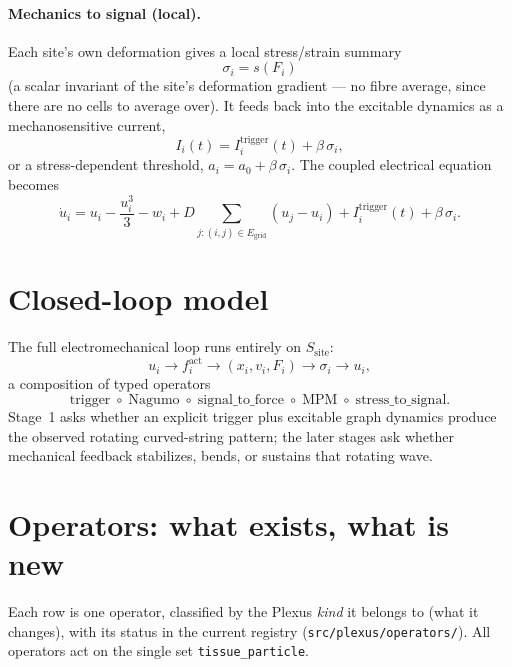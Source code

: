 \documentclass[11pt]{article}
\newcommand{\code}[1]{\texttt{#1}}
\begin{document}
\paragraph{Mechanics to signal (local).}
Each site's own deformation gives a local stress/strain summary
\[
  \sigma_i = s(F_i)
\]
(a scalar invariant of the site's deformation gradient --- no fibre average, since
there are no cells to average over). It feeds back into the excitable dynamics as a
mechanosensitive current,
\[
  I_i(t)=I_i^{\mathrm{trigger}}(t)+\beta\,\sigma_i,
\]
or a stress-dependent threshold, $a_i=a_0+\beta\,\sigma_i$. The coupled electrical
equation becomes
\[
  \dot u_i
    = u_i-\frac{u_i^3}{3}-w_i
      + D\!\!\sum_{j:(i,j)\in E_{\mathrm{grid}}}\!\!(u_j-u_i)
      + I_i^{\mathrm{trigger}}(t)
      + \beta\,\sigma_i.
\]

\section{Closed-loop model}

The full electromechanical loop runs entirely on $S_{\mathrm{site}}$:
\[
  u_i
  \longrightarrow f_i^{\mathrm{act}}
  \longrightarrow (x_i,v_i,F_i)
  \longrightarrow \sigma_i
  \longrightarrow u_i,
\]
a composition of typed operators
\[
  \mathrm{trigger}\;\circ\;\mathrm{Nagumo}\;\circ\;
  \mathrm{signal\_to\_force}\;\circ\;\mathrm{MPM}\;\circ\;\mathrm{stress\_to\_signal}.
\]
Stage~1 asks whether an explicit trigger plus excitable graph dynamics produce the
observed rotating curved-string pattern; the later stages ask whether mechanical
feedback stabilizes, bends, or sustains that rotating wave.

\section{Operators: what exists, what is new}

Each row is one operator, classified by the Plexus \emph{kind} it belongs to (what
it changes), with its status in the current registry
(\code{src/plexus/operators/}). All operators act on the single set
\code{tissue\_particle}.
\end{document}
